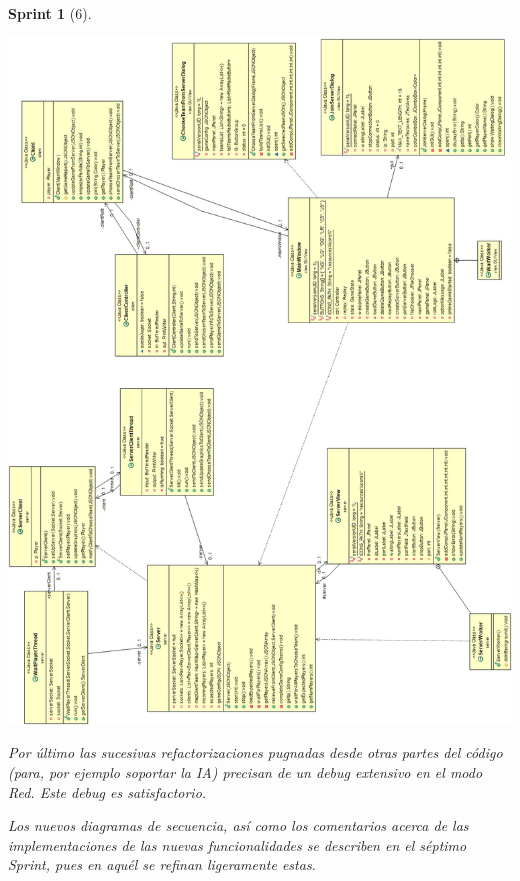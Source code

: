 \documentclass{article}
\theoremstyle{break}
\newtheorem*{sprint}{Sprint}
\begin{document}
\begin{sprint}[6]
\begin{itemize}
\begin{center}
\includegraphics[scale=0.45]{UMLClasesRedSprint6.png} 
\end{center}

\end{itemize}

Por último las sucesivas refactorizaciones pugnadas desde otras partes del código (para, por ejemplo soportar la IA) precisan de un debug extensivo en el modo Red. Este debug es satisfactorio.

Los nuevos diagramas de secuencia, así como los comentarios acerca de las implementaciones de las nuevas funcionalidades se describen en el séptimo Sprint, pues en aquél se refinan ligeramente estas.

\end{sprint}
\end{document}

